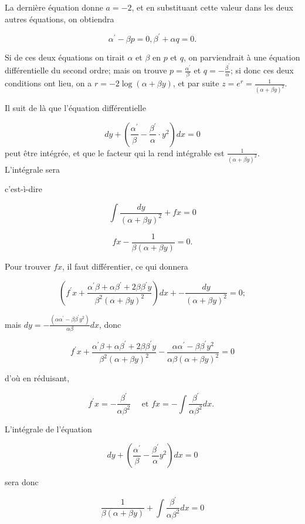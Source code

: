 \documentclass{article}
\begin{document}
La dernière équation donne \(a=-2\), et en substituant cette valeur dans les deux autres équations, on obtiendra

\[
\alpha^{\prime}-\beta p=0, \beta^{\prime}+\alpha q=0 .
\]

\(\mathrm{Si}\) de ces deux équations on tirait \(\alpha\) et \(\beta\) en \(p\) et \(q\), on parviendrait à une équation différentielle du second ordre; mais on trouve \(p=\frac{\alpha^{\prime}}{\beta}\) et \(q=-\frac{\beta^{\prime}}{\alpha}\); si donc ces deux conditions ont lieu, on a \(r=-2 \log (\alpha+\beta y)\), et par suite \(z=e^{r}=\frac{1}{(\alpha+\beta y)^{2}}\).

Il suit de là que l'équation différentielle

\[
d y+\left(\frac{\alpha^{\prime}}{\beta}-\frac{\beta^{\prime}}{\alpha} \cdot y^{2}\right) d x=0
\]
peut être intégrée, et que le facteur qui la rend intégrable est \(\frac{1}{(\alpha+\beta y)^{2}}\). L'intégrale sera

c'est-ì-dire

\[
\int \frac{d y}{(\alpha+\beta y)^{2}}+f x=0
\]

\[
f x-\frac{1}{\beta(\alpha+\beta y)}=0 .
\]

Pour trouver \(f x\), il faut différentier, ce qui donnera

\[
\left(f^{\prime} x+\frac{\alpha^{\prime} \beta+\alpha \beta^{\prime}+2 \beta \beta^{\prime} y}{\beta^{2}(\alpha+\beta y)^{2}}\right) d x+-\frac{d y}{(\alpha+\beta y)^{2}}=0 ;
\]

mais \(d y=-\frac{\left(\alpha \alpha^{\prime}-\beta \beta^{\prime} y^{2}\right)}{\alpha \beta} d x\), donc

\[
f^{\prime} x+\frac{\alpha^{\prime} \beta+\alpha \beta^{\prime}+2 \beta \beta^{\prime} y}{\beta^{2}(\alpha+\beta y)^{2}}-\frac{\alpha \alpha^{\prime}-\beta \beta^{\prime} y^{2}}{\alpha \beta(\alpha+\beta y)^{2}}=0
\]

d'où en réduisant,

\[
f^{\prime} x=-\frac{\beta^{\prime}}{\alpha \beta^{2}} \quad \text { et } f x=-\int \frac{\beta^{\prime}}{\alpha \beta^{2}} d x \text {. }
\]

L'intégrale de l'équation

\[
d y+\left(\frac{\alpha^{\prime}}{\beta}-\frac{\beta^{\prime}}{\alpha} y^{2}\right) d x=0
\]

sera donc

\[
\frac{1}{\beta(\alpha+\beta y)}+\int \frac{\beta^{\prime}}{\alpha \beta^{2}} d x=0
\]
\end{document}
